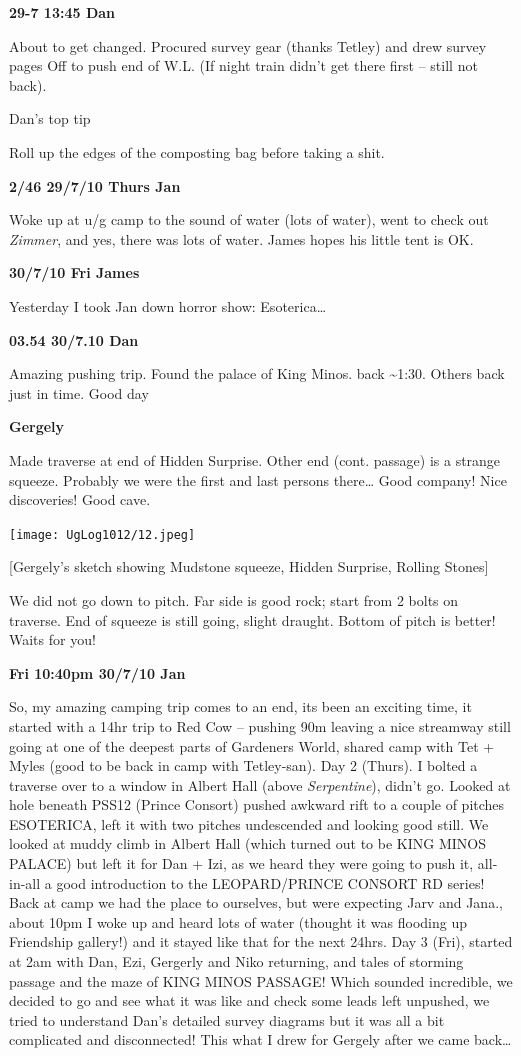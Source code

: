 \textbf{29-7 13:45 Dan}

About to get changed. Procured survey gear (thanks Tetley) and drew
survey pages Off to push end of W.L. (If night train didn't get there
first -- still not back).

Dan's top tip

Roll up the edges of the composting bag before taking a shit.

\textbf{2/46 29/7/10 Thurs Jan}

Woke up at u/g camp to the sound of water (lots of water), went to check
out \emph{Zimmer}, and yes, there was lots of water. James hopes his
little tent is OK.

\textbf{30/7/10 Fri James}

Yesterday I took Jan down horror show: Esoterica\ldots{}

\textbf{03.54 30/7.10 Dan}

Amazing pushing trip. Found the palace of King Minos. back
\textasciitilde{}1:30. Others back just in time. Good day

\textbf{Gergely}

Made traverse at end of Hidden Surprise. Other end (cont. passage) is a
strange squeeze. Probably we were the first and last persons
there\ldots{} Good company! Nice discoveries! Good cave.

\texttt{[image: UgLog1012/12.jpeg]}

{[}Gergely's sketch showing Mudstone squeeze, Hidden Surprise, Rolling
Stones{]}

We did not go down to pitch. Far side is good rock; start from 2 bolts
on traverse. End of squeeze is still going, slight draught. Bottom of
pitch is better! Waits for you!

\textbf{Fri 10:40pm 30/7/10 Jan}

So, my amazing camping trip comes to an end, its been an exciting time,
it started with a 14hr trip to Red Cow -- pushing 90m leaving a nice
streamway still going at one of the deepest parts of Gardeners World,
shared camp with Tet + Myles (good to be back in camp with Tetley-san).
Day 2 (Thurs). I bolted a traverse over to a window in Albert Hall
(above \emph{Serpentine}), didn't go. Looked at hole beneath PSS12
(Prince Consort) pushed awkward rift to a couple of pitches ESOTERICA,
left it with two pitches undescended and looking good still. We looked
at muddy climb in Albert Hall (which turned out to be KING MINOS PALACE)
but left it for Dan + Izi, as we heard they were going to push it,
all-in-all a good introduction to the LEOPARD/PRINCE CONSORT RD series!
Back at camp we had the place to ourselves, but were expecting Jarv and
Jana., about 10pm I woke up and heard lots of water (thought it was
flooding up Friendship gallery!) and it stayed like that for the next
24hrs. Day 3 (Fri), started at 2am with Dan, Ezi, Gergerly and Niko
returning, and tales of storming passage and the maze of KING MINOS
PASSAGE! Which sounded incredible, we decided to go and see what it was
like and check some leads left unpushed, we tried to understand Dan's
detailed survey diagrams but it was all a bit complicated and
disconnected! This what I drew for Gergely after we came back\ldots{}

